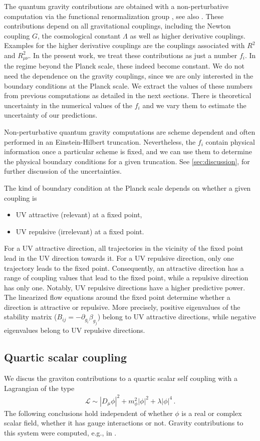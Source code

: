 \documentclass[aps,prd,twocolumn,preprintnumbers,superscriptaddress,nobibnotes,floatfix,longbibliography]{revtex4-1}
\begin{document}
The quantum gravity contributions are obtained with a non-perturbative computation via the functional renormalization group \cite{Wetterich:1992yh}, see also \cite{Ellwanger:1993mw,Morris:1993qb}.
These contributions depend on all gravitational couplings, including the Newton coupling $G$, the cosmological constant $\Lambda$ as well as higher derivative couplings.
Examples for the higher derivative couplings are the couplings associated with $R^2$ and $R_{\mu\nu}^2$.
In the present work, we treat these contributions as just a number $f_i$.
In the regime beyond the Planck scale, these indeed become constant.
We do not need the dependence on the gravity couplings,
since we are only interested in the boundary conditions at the Planck scale.
We extract the values of these numbers from previous computations as detailed in the next sections.
There is theoretical uncertainty in the numerical values of the $f_i$ and we vary them to estimate the uncertainty of our predictions.

Non-perturbative quantum gravity computations are scheme dependent and often performed in an Einstein-Hilbert truncation. 
Nevertheless, the $f_i$ contain physical information once a particular scheme is fixed, and we can use them to determine the physical boundary conditions for a given truncation.
See \autoref{sec:discussion}, for further discussion of the uncertainties.

The kind of boundary condition at the Planck scale depends on whether a given coupling is 
\begin{itemize}
\item UV attractive (relevant) at a fixed point,
\item UV repulsive (irrelevant) at a fixed point.
\end{itemize}
For a UV attractive direction, all trajectories in the vicinity of the fixed point lead in the UV direction towards it.
For a UV repulsive direction, only one trajectory leads to the fixed point.
Consequently, an attractive direction has a range of coupling values that lead to the fixed point, while a repulsive direction has only one.
Notably, UV repulsive directions have a higher predictive power.  
The linearized flow equations around the fixed point determine whether a direction is attractive or repulsive.
More precisely, positive eigenvalues of the stability matrix ($B_{ij}=-\partial_{g_i} \beta_{g_j}$) belong to UV attractive directions,
while negative eigenvalues belong to UV repulsive directions.


\subsection{Quartic scalar coupling}
We discus the graviton contributions to a quartic scalar self coupling with a Lagrangian of the type
\begin{align}
\mathcal L \sim |D_\mu \phi|^2 + m_\phi^2 |\phi|^2 + \lambda |\phi|^4 \,.
\end{align}
The following conclusions hold independent of whether $\phi$ is a real or complex scalar field, whether it has gauge interactions or not.
Gravity contributions to this system were computed, e.g., in \cite{Percacci:2003jz,Rodigast:2009zj,Zanusso:2009bs,Narain:2009fy,Eichhorn:2017als,Pawlowski:2018ixd}.
\end{document}
